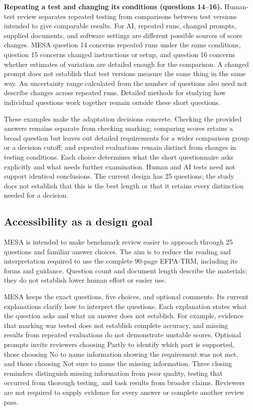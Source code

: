 \documentclass[10pt,conference]{IEEEtran}
\begin{document}
\textbf{Repeating a test and changing its conditions (questions 14--16).} Human-test review separates repeated testing from comparisons between test versions intended to give comparable results. For AI, repeated runs, changed prompts, supplied documents, and software settings are different possible sources of score changes. MESA question 14 concerns repeated runs under the same conditions, question 15 concerns changed instructions or setup, and question 16 concerns whether estimates of variation are detailed enough for the comparison. A changed prompt does not establish that test versions measure the same thing in the same way. An uncertainty range calculated from the number of questions also need not describe changes across repeated runs. Detailed methods for studying how individual questions work together remain outside these short questions.

These examples make the adaptation decisions concrete. Checking the provided answers remains separate from checking marking; comparing scores retains a broad question but leaves out detailed requirements for a wider comparison group or a decision cutoff; and repeated evaluations remain distinct from changes in testing conditions. Each choice determines what the short questionnaire asks explicitly and what needs further examination. Human and AI tests need not support identical conclusions. The current design has 25 questions; the study does not establish that this is the best length or that it retains every distinction needed for a decision.

\subsection{Accessibility as a design goal}
MESA is intended to make benchmark review easier to approach through 25 questions and familiar answer choices. The aim is to reduce the reading and interpretation required to use the complete 90-page EFPA-TRM, including its forms and guidance. Question count and document length describe the materials; they do not establish lower human effort or easier use.

MESA keeps the exact questions, five choices, and optional comments. Its current explanations clarify how to interpret the questions. Each explanation states what the question asks and what an answer does not establish. For example, evidence that marking was tested does not establish complete accuracy, and missing results from repeated evaluations do not demonstrate unstable scores. Optional prompts invite reviewers choosing Partly to identify which part is supported, those choosing No to name information showing the requirement was not met, and those choosing Not sure to name the missing information. Three closing reminders distinguish missing information from poor quality, testing that occurred from thorough testing, and task results from broader claims. Reviewers are not required to supply evidence for every answer or complete another review pass.
\end{document}
